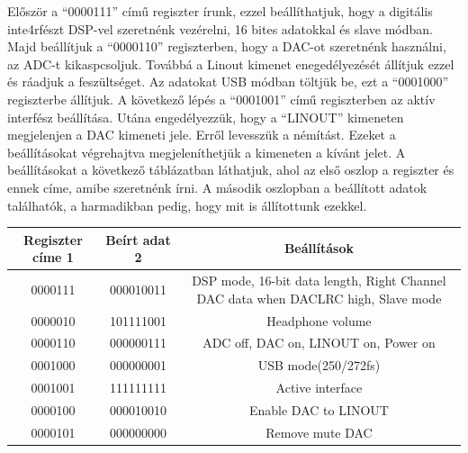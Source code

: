 \documentclass[a4paper,12pt]{article}
\begin{document}
		Először a “0000111” című regiszter írunk, ezzel beállíthatjuk, hogy a digitális inte4rfészt DSP-vel szeretnénk vezérelni, 16 bites adatokkal és slave módban.
		Majd beállítjuk a “0000110” regiszterben, hogy a DAC-ot szeretnénk használni, az ADC-t kikaspcsoljuk. Továbbá a Linout kimenet enegedélyezését állítjuk ezzel és ráadjuk a feszültséget. Az adatokat USB módban töltjük be, ezt a “0001000” regiszterbe állítjuk. A következő lépés a “0001001” című regiszterben az aktív interfész beállítása. Utána engedélyezzük, hogy a “LINOUT” kimeneten megjelenjen a DAC kimeneti jele. Erről levesszük a némítást. Ezeket a beállításokat végrehajtva megjeleníthetjük a kimeneten a kívánt jelet.
		A beállításokat a következő táblázatban láthatjuk, ahol az első oszlop a regiszter és ennek címe, amibe szeretnénk írni. A második oszlopban a beállított adatok találhatók, a harmadikban pedig, hogy mit is állítottunk ezekkel.
		
		\begin{tabular}{|c|c|c|}
			\hline
			Regiszter címe 1 & Beírt adat  2 & Beállítások \\
			\hline
			0000111 & 000010011 & DSP mode, 16-bit data length, Right Channel DAC data when DACLRC high, Slave mode \\
			0000010 & 101111001 & Headphone volume \\
			0000110 & 000000111 & ADC off, DAC on, LINOUT on, Power on \\
			0001000 & 000000001 & USB mode(250/272fs) \\
			0001001 & 111111111 & Active interface \\
			0000100 & 000010010 & Enable DAC to LINOUT \\
			0000101 & 000000000 & Remove mute DAC \\
			\hline
		\end{tabular}
		
\end{document}
